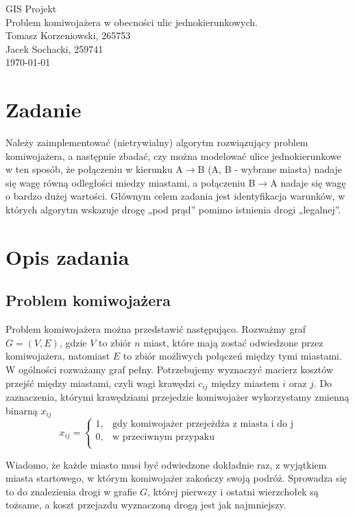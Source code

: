\documentclass[11pt,a4paper,twoside]{article}
\begin{document}
\begin{center}
\vspace*{3\baselineskip}
{\LARGE{GIS Projekt}}
\\
\vspace*{1\baselineskip}
{\large{Problem komiwojażera w obecności ulic jednokierunkowych.}}
\\
\vspace*{1\baselineskip}
Tomasz Korzeniowski, 265753\\
Jacek Sochacki, 259741
\\
\vspace*{1\baselineskip}
\today
\end{center}
\section{Zadanie}
Należy zaimplementować (nietrywialny) algorytm rozwiązujący problem komiwojażera, a następnie zbadać, czy można modelować ulice jednokierunkowe w ten sposób, że połączeniu w kierunku A$\rightarrow$B (A, B - wybrane miasta) nadaje się wagę równą odległości miedzy miastami, a połączeniu B$\rightarrow$A nadaje się wagę o bardzo dużej wartości. Głównym celem zadania jest identyfikacja warunków, w których algorytm wskazuje drogę „pod prąd” pomimo istnienia drogi „legalnej”.
\section{Opis zadania}
\subsection{Problem komiwojażera}
Problem komiwojażera można przedstawić następująco. Rozważmy graf $G=(V, E)$, gdzie $V$ to zbiór $n$ miast, które mają zostać odwiedzone przez komiwojażera, natomiast $E$ to zbiór możliwych połączeń między tymi miastami. W ogólności rozważamy graf pełny. Potrzebujemy wyznaczyć macierz kosztów przejść między miastami, czyli wagi krawędzi $c_{ij}$ między miastem $i$ oraz $j$. Do zaznaczenia, którymi krawędziami przejedzie komiwojażer wykorzystamy zmienną binarną $x_{ij}$
$$x_{ij} = 
	\begin{cases} 
      1, & \text{gdy komiwojażer przejeżdża z miasta i do j} \\
      0, & \text{w przeciwnym przypaku}\\
   \end{cases}
$$

Wiadomo, że każde miasto musi być odwiedzone dokładnie raz, z wyjątkiem miasta startowego, w którym komiwojażer zakończy swoją podróż. Sprowadza się to do znalezienia drogi w grafie $G$, której pierwszy i ostatni wierzchołek są tożsame, a koszt przejazdu wyznaczoną drogą jest jak najmniejszy. 
\end{document}
